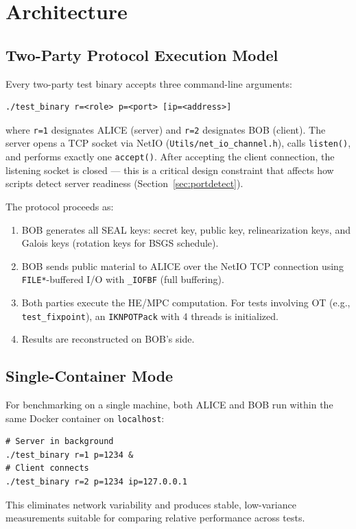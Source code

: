 \section{Architecture}\label{sec:architecture}

\subsection{Two-Party Protocol Execution Model}

Every two-party test binary accepts three command-line arguments:
\begin{lstlisting}
./test_binary r=<role> p=<port> [ip=<address>]
\end{lstlisting}
where \texttt{r=1} designates ALICE (server) and \texttt{r=2} designates BOB (client).
The server opens a TCP socket via NetIO (\texttt{Utils/net\_io\_channel.h}), calls \texttt{listen()}, and performs exactly one \texttt{accept()}.
After accepting the client connection, the listening socket is closed --- this is a critical design constraint that affects how scripts detect server readiness (Section~\ref{sec:portdetect}).

The protocol proceeds as:
\begin{enumerate}[nosep]
  \item BOB generates all SEAL keys: secret key, public key, relinearization keys, and Galois keys (rotation keys for BSGS schedule).
  \item BOB sends public material to ALICE over the NetIO TCP connection using \texttt{FILE*}-buffered I/O with \texttt{\_IOFBF} (full buffering).
  \item Both parties execute the HE/MPC computation. For tests involving OT (e.g., \texttt{test\_fixpoint}), an \texttt{IKNPOTPack} with 4 threads is initialized.
  \item Results are reconstructed on BOB's side.
\end{enumerate}

\subsection{Single-Container Mode}

For benchmarking on a single machine, both ALICE and BOB run within the same Docker container on \texttt{localhost}:
\begin{lstlisting}
# Server in background
./test_binary r=1 p=1234 &
# Client connects
./test_binary r=2 p=1234 ip=127.0.0.1
\end{lstlisting}
This eliminates network variability and produces stable, low-variance measurements suitable for comparing relative performance across tests.

